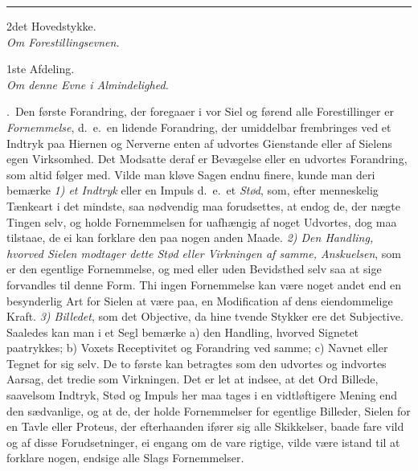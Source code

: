\documentclass[12pt,a4paper]{article}
\newcommand{\hovedstykke}[2]{%
  \bigskip\begin{center}{\Large #1}\\[6pt]{\large \emph{#2}}\end{center}\smallskip}
\newcommand{\afdeling}[2]{%
  \medskip\begin{center}{\large #1}\\[4pt]{\emph{#2}}\end{center}\smallskip}
\newcommand{\opage}[1]{\marginnote{\footnotesize\textit{[#1]}}}
\begin{document}
\begin{center}\rule{0.30\linewidth}{0.4pt}\end{center}


\hovedstykke{2det Hovedstykke.}{Om Forestillingsevnen.}

\afdeling{1ste Afdeling.}{Om denne Evne i Almindelighed.}

.~Den første Forandring, der foregaaer i vor Siel og førend alle Forestillinger
er \emph{Fornemmelse}, d.~e.\ en lidende Forandring, der umiddelbar frembringes ved
et Indtryk paa Hiernen og Nerverne enten af udvortes Gienstande eller af Sielens
egen Virksomhed. Det Modsatte deraf er Bevægelse eller en udvortes Forandring, som
altid følger med. Vilde man kløve Sagen endnu finere, kunde man deri bemærke
\emph{1) et Indtryk} eller en Impuls d.~e.\ et \emph{Stød}, som, efter menneskelig
Tænkeart i det mindste, saa nødvendig maa
\opage{35} forudsettes, at endog de, der nægte Tingen selv, og holde Fornemmelsen for
uafhængig af noget Udvortes, dog maa tilstaae, de ei kan forklare den paa nogen
anden Maade. \emph{2) Den Handling, hvorved Sielen modtager dette Stød eller
Virkningen af samme, Anskuelsen}, som er den egentlige Fornemmelse, og med eller
uden Bevidsthed selv saa at sige forvandles til denne Form. Thi ingen Fornemmelse
kan være noget andet end en besynderlig Art for Sielen at være paa, en Modification
af dens eiendommelige Kraft. \emph{3) Billedet}, som det Objective, da hine tvende
Stykker ere det Subjective. Saaledes kan man i et Segl bemærke a) den Handling,
hvorved Signetet paatrykkes; b) Voxets Receptivitet og Forandring ved samme; c)
Navnet eller Tegnet for sig selv. De to første kan betragtes som den udvortes og
indvortes Aarsag, det tredie som Virkningen. Det er let at indsee, at det Ord
Billede, saavelsom Indtryk, Stød og Impuls her maa tages i en vidtløftigere Mening
end den sædvanlige, og at de, der holde Fornemmelser for egentlige Billeder, Sielen
for en Tavle eller Proteus, der efterhaanden ifører sig alle Skikkelser, baade fare
vild og af disse Forudsetninger, ei engang om de vare rigtige, vilde være istand
til at forklare nogen, endsige alle Slags Fornemmelser.
\end{document}
